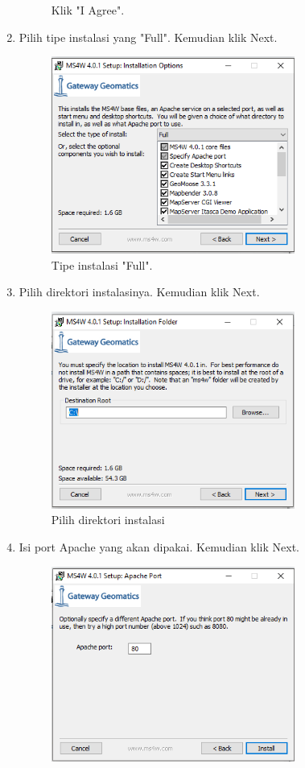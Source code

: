 \begin{enumerate}
\begin{figure}[H]
		\caption{Klik "I Agree".}
	\end{figure}
	\item  Pilih tipe instalasi yang "Full". Kemudian klik Next.
	\hfill\break
	\begin{figure}[H]
		\includegraphics[width=8cm]{figures/Tugas4/1174087/4.png}
		\centering
		\caption{Tipe instalasi "Full".}
	\end{figure}
	\item  Pilih direktori instalasinya. Kemudian klik Next.
	\hfill\break
	\begin{figure}[H]
		\includegraphics[width=8cm]{figures/Tugas4/1174087/5.png}
		\centering
		\caption{Pilih direktori instalasi}
	\end{figure}
	\item  Isi port Apache yang akan dipakai. Kemudian klik Next.
	\hfill\break
	\begin{figure}[H]
		\includegraphics[width=8cm]{figures/Tugas4/1174087/6.png}

\end{figure}
\end{enumerate}

